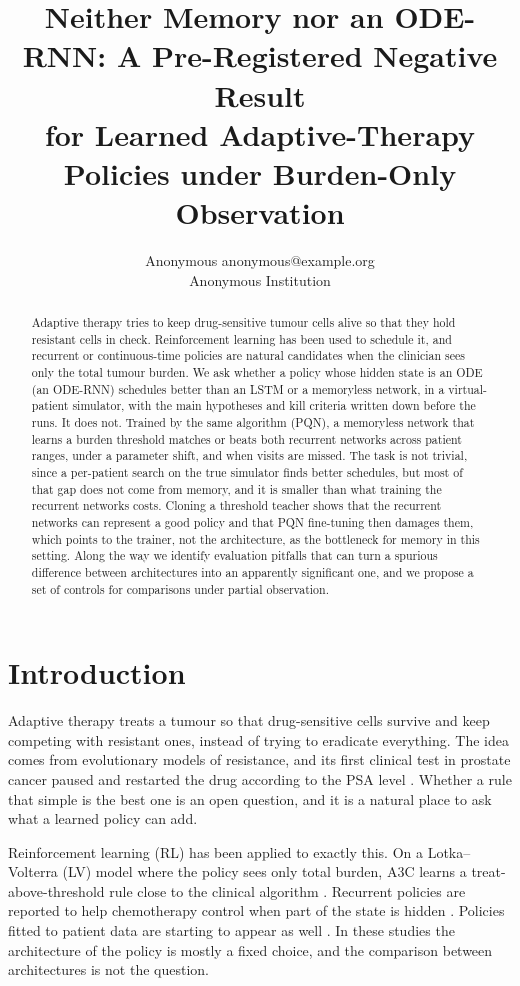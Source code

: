 \documentclass[10pt]{article}
\title{Neither Memory nor an ODE-RNN: A Pre-Registered Negative Result\\
for Learned Adaptive-Therapy Policies under Burden-Only Observation}
\author{\name Anonymous \email anonymous@example.org \\ \addr Anonymous Institution}
\renewcommand{\cite}{\citep}  %
\begin{document}
\maketitle

\begin{abstract}
Adaptive therapy tries to keep drug-sensitive tumour cells alive so that they
hold resistant cells in check. Reinforcement learning has been used to schedule
it, and recurrent or continuous-time policies are natural candidates when the
clinician sees only the total tumour burden. We ask whether a policy whose
hidden state is an ODE (an ODE-RNN) schedules better than an LSTM or a
memoryless network, in a virtual-patient simulator, with the main hypotheses and
kill criteria written down before the runs. It does not. Trained by the same
algorithm (PQN), a memoryless network that learns a burden threshold matches or
beats both recurrent networks across patient ranges, under a parameter shift,
and when visits are missed. The task is not trivial, since a per-patient search
on the true simulator finds better schedules, but most of that gap does not
come from memory, and it is smaller than what training the recurrent networks
costs. Cloning a threshold teacher shows that the recurrent networks can
represent a good policy and that PQN fine-tuning then damages them, which
points to the trainer, not the architecture, as the bottleneck for memory in
this setting.
Along the way we identify evaluation pitfalls that can turn a spurious
difference between architectures into an apparently significant one, and we
propose a set of controls for comparisons under partial observation.
\end{abstract}

\section{Introduction}
Adaptive therapy treats a tumour so that drug-sensitive cells survive and keep
competing with resistant ones, instead of trying to eradicate everything. The
idea comes from evolutionary models of resistance, and its first clinical test
in prostate cancer paused and restarted the drug according to the PSA level
\cite{zhang2017}. Whether a rule that simple is the best one is an open
question, and it is a natural place to ask what a learned policy can add.

Reinforcement learning (RL) has been applied to exactly this. On a
Lotka--Volterra (LV) model where the policy sees only total burden, A3C learns a
treat-above-threshold rule close to the clinical algorithm \cite{gallagher2024}.
Recurrent policies are reported to help chemotherapy control when part of the
state is hidden \cite{kiram2026}. Policies fitted to patient data are starting
to appear as well \cite{lu2024}. In these studies the architecture of the policy
is mostly a fixed choice, and the comparison between architectures is not the
question.
\end{document}
